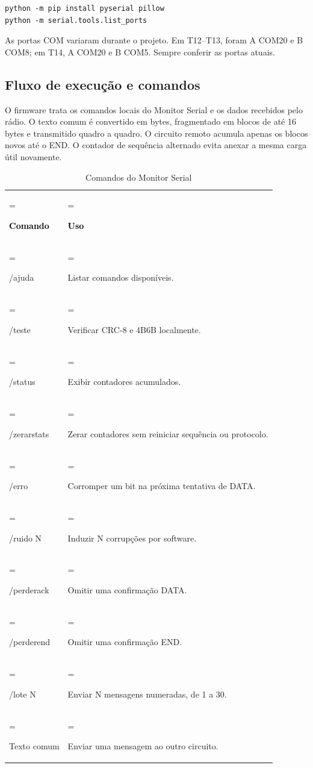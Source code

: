 \par\noindent\begin{minipage}{\linewidth}
\begin{lstlisting}
python -m pip install pyserial pillow
python -m serial.tools.list_ports
\end{lstlisting}
\end{minipage}\par
{\small As portas COM variaram durante o projeto. Em T12–T13, foram A COM20 e B COM8; em T14, A COM20 e B COM5. Sempre conferir as portas atuais.\par}
\setcounter{subsection}{1}\subsection{Fluxo de execução e comandos}
O firmware trata os comandos locais do Monitor Serial e os dados recebidos pelo rádio. O texto comum é convertido em bytes, fragmentado em blocos de até 16 bytes e transmitido quadro a quadro. O circuito remoto acumula apenas os blocos novos até o END. O contador de sequência alternado evita anexar a mesma carga útil novamente.

\begin{table}[H]\centering\small\caption{Comandos do Monitor Serial}\label{tab:6}
\begin{tabularx}{\linewidth}{>{\hsize=0.5278\hsize\linewidth=\hsize\raggedright\arraybackslash}X>{\hsize=1.4722\hsize\linewidth=\hsize\raggedright\arraybackslash}X}
\rowcolor{tcdtablehead} \textcolor{black}{\textbf{Comando}} & \textcolor{black}{\textbf{Uso}} \\
/\allowbreak ajuda & Listar comandos disponíveis. \\
/\allowbreak teste & Verificar CRC-8 e 4B6B localmente. \\
/\allowbreak status & Exibir contadores acumulados. \\
/\allowbreak zerarstats & Zerar contadores sem reiniciar sequência ou protocolo. \\
/\allowbreak erro & Corromper um bit na próxima tentativa de DATA. \\
/\allowbreak ruido N & Induzir N corrupções por software. \\
/\allowbreak perderack & Omitir uma confirmação DATA. \\
/\allowbreak perderend & Omitir uma confirmação END. \\
/\allowbreak lote N & Enviar N mensagens numeradas, de 1 a 30. \\
Texto comum & Enviar uma mensagem ao outro circuito. \\
\bottomrule\end{tabularx}\end{table}
